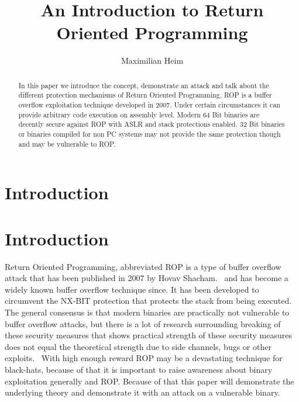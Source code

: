 \documentclass[journal=tosc,submission, notanonymous]{iacrtrans}
\author{Maximilian Heim\inst{1}}
\institute{
  University Albstadt-Sigmaringen, Albstadt, Germany, \email{MaximilianHeim@protonmail.com}
}
\title{An Introduction to Return Oriented Programming}
\begin{document}
\maketitle




\begin{abstract}
  In this paper we introduce the concept, demonstrate an attack and talk about the different protection mechanisms of Return Oriented Programming. ROP is a buffer overflow exploitation technique developed in 2007. Under certain circumstances it can provide arbitrary code execution on assembly level. Modern 64 Bit binaries are decently secure against ROP with ASLR and stack protections enabled. 32 Bit binaries or binaries compiled for non PC systems may not provide the same protection though and may be vulnerable to ROP.
\end{abstract}

\section{Introduction}

\section{Introduction}
Return Oriented Programming, abbreviated ROP is a type of buffer overflow attack that has been published in 2007 by Hovav Shacham.~\cite{ropfirstpaper} and has become a widely known buffer overflow technique since. It has been developed to circumvent the NX-BIT protection that protects the stack from being executed. The general consensus is that modern binaries are practically not vulnerable to buffer overflow attacks, but there is a lot of research surrounding breaking of these security measures that shows practical strength of these security measures does not equal the theoretical strength due to side channels, bugs or other exploits.~\cite{aslr} With high enough reward ROP may be a devastating technique for black-hats, because of that it is important to raise awareness about binary exploitation generally and ROP. Because of that this paper will demonstrate the underlying theory and demonstrate it with an attack on a vulnerable binary.
\end{document}
